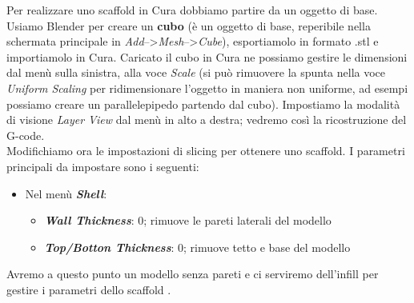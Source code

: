 Per realizzare uno scaffold in Cura dobbiamo partire da un oggetto di base. Usiamo Blender per creare un \textbf{cubo} (è un oggetto di base, reperibile nella schermata principale in \emph{Add}-->\emph{Mesh}-->\emph{Cube}), esportiamolo in formato .stl e importiamolo in Cura.
Caricato il cubo in Cura ne possiamo gestire le dimensioni dal menù sulla sinistra, alla voce \emph{Scale} (si può rimuovere la spunta nella voce \emph{Uniform Scaling} per ridimensionare l'oggetto in maniera non uniforme, ad esempi possiamo creare un parallelepipedo partendo dal cubo). Impostiamo la modalità di visione \emph{Layer View} dal menù in alto a destra; vedremo così la ricostruzione del G-code.\\
Modifichiamo ora le impostazioni di slicing per ottenere uno scaffold. I parametri principali da impostare sono i seguenti:

\begin{itemize}

\item Nel menù \emph{\textbf{Shell}}:
\begin{itemize}
\item \emph{\textbf{Wall Thickness}}: 0; rimuove le pareti laterali del modello
\item \emph{\textbf{Top/Botton Thickness}}: 0; rimuove tetto e base del modello
\end{itemize}

\end{itemize}

Avremo a questo punto un modello senza pareti e ci serviremo dell'infill per gestire i parametri dello scaffold \parencite{Reference138}.

